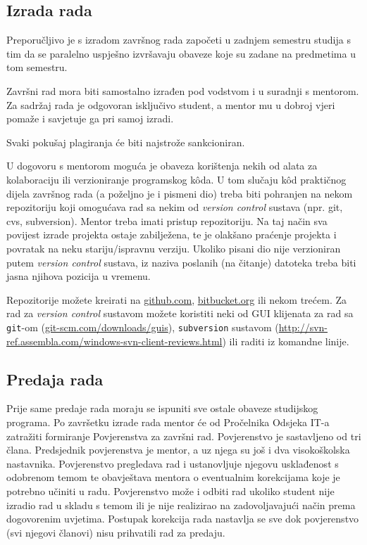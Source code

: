 \subsection{Izrada rada}
Preporučljivo je s izradom završnog rada započeti u zadnjem semestru studija s tim da se paralelno uspješno izvršavaju obaveze koje su zadane na predmetima u tom semestru.

Završni rad mora biti samostalno izrađen pod vodstvom i u suradnji s mentorom. Za sadržaj rada je odgovoran isključivo student, a mentor mu u dobroj vjeri pomaže i savjetuje ga pri samoj izradi.

Svaki pokušaj plagiranja će biti najstrože sankcioniran.

U dogovoru s mentorom moguća je obaveza korištenja nekih od alata za kolaboraciju ili verzioniranje programskog k\^oda. U tom slučaju k\^od praktičnog dijela završnog rada (a poželjno je i pismeni dio) treba biti pohranjen na nekom repozitoriju koji omogućava rad sa nekim od \textit{version control} sustava (npr. git, cvs, subversion). Mentor treba imati pristup repozitoriju. Na taj način sva povijest izrade projekta ostaje zabilježena, te je olakšano praćenje projekta i povratak na neku stariju/ispravnu verziju. Ukoliko pisani dio nije verzioniran putem \textit{version control} sustava, iz naziva poslanih (na čitanje) datoteka treba biti jasna njihova pozicija u vremenu.  
 
Repozitorije možete kreirati na \url{github.com}, \url{bitbucket.org} ili nekom trećem. Za rad za \textit{version control} sustavom možete koristiti neki od GUI klijenata za rad sa 
 \texttt{git}-om (\url{git-scm.com/downloads/guis}), \texttt{subversion} sustavom (\url{http://svn-ref.assembla.com/windows-svn-client-reviews.html}) ili raditi iz komandne linije.
 
 \subsection{Predaja rada}
Prije same predaje rada moraju se ispuniti sve ostale obaveze studijskog programa. Po završetku izrade rada mentor će od Pročelnika Odsjeka IT-a zatražiti formiranje Povjerenstva za završni rad. Povjerenstvo je sastavljeno od tri člana. Predsjednik povjerenstva je mentor, a uz njega su još i dva visokoškolska nastavnika. Povjerenstvo pregledava rad i ustanovljuje njegovu usklađenost s odobrenom temom te obavještava mentora o eventualnim korekcijama koje je potrebno učiniti u radu. Povjerenstvo može i odbiti rad ukoliko student nije izradio rad u skladu s temom ili je nije realizirao na zadovoljavajući način prema dogovorenim uvjetima. Postupak korekcija rada nastavlja se sve dok povjerenstvo (svi njegovi članovi) nisu prihvatili rad za predaju. 

